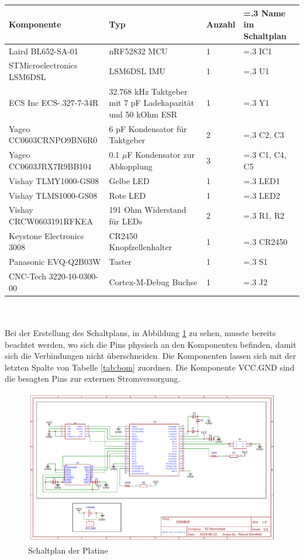 \begin{minipage}{\linewidth}
	\label{tab:bom}
	\begin{tabularx}{\linewidth}{l|X|l|>{\hsize=.3\hsize}X}
		Komponente & Typ & Anzahl & Name im Schaltplan\\
		\hline
		Laird BL652-SA-01 & nRF52832 MCU & 1 & IC1\\
		STMicroelectronics LSM6DSL & LSM6DSL IMU & 1 & U1\\
		ECS Inc ECS-.327-7-34R & 32.768 kHz Taktgeber mit 7 pF Ladekapazität und 50 kOhm ESR & 1 & Y1\\
		Yageo CC0603CRNPO9BN6R0 & 6 pF Kondensator für Taktgeber & 2 & C2, C3\\
		Yageo CC0603JRX7R9BB104 & 0.1 $\mu$F Kondensator zur Abkopplung & 3 & C1, C4, C5\\
		Vishay TLMY1000-GS08 & Gelbe LED & 1 & LED1\\
		Vishay TLMS1000-GS08 & Rote LED & 1 & LED2\\
		Vishay CRCW0603191RFKEA & 191 Ohm Widerstand für LEDs & 2 & R1, R2\\
		Keystone Electronics 3008 & CR2450 Knopfzellenhalter & 1 & CR2450\\
		Panasonic EVQ-Q2B03W & Taster & 1 & S1\\
		CNC-Tech 3220-10-0300-00 & Cortex-M-Debug Buchse & 1 & J2\\
  \end{tabularx}
\end{minipage}\\\\
Bei der Erstellung des Schaltplans, in Abbildung \ref{fig:schematic} zu sehen, musste bereits beachtet werden, wo sich die Pins physisch an den Komponenten befinden, damit sich die Verbindungen nicht überschneiden.
Die Komponenten lassen sich mit der letzten Spalte von Tabelle \ref{tab:bom} zuordnen.
Die Komponente VCC.GND sind die besagten Pins zur externen Stromversorgung.
\begin{figure}[p]
	\centering
	\includegraphics[height=0.8\linewidth,angle=90]{res/schematic.pdf}
	\caption{Schaltplan der Platine}
	\label{fig:schematic}
\end{figure}\\
